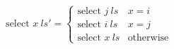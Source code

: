 \documentclass[8pt]{article}
\begin{document}
$$
\text{select } x \ ls' = \left\{\begin{array}{cc}\text{select } j \ ls  & x = i \\\text{select } i \ ls  & x = j \\\text{select } x \ ls  & \text{otherwise}\end{array}\right.
$$
\end{document}
